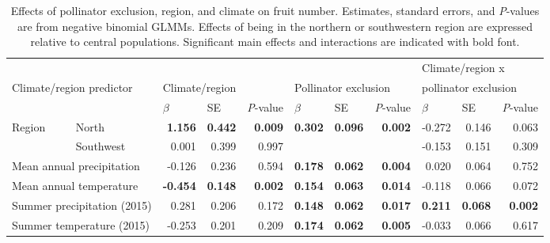 \documentclass{article}
\begin{document}
\clearpage


\begin{table}[p]
\centering
\caption[Effects of pollinator exclusion, region, and climate on fruit number.]{Effects of pollinator exclusion, region, and climate on fruit number. Estimates, standard errors, and \textit{P}-values are from negative binomial GLMMs. Effects of being in the northern or southwestern region are expressed relative to central populations. Significant main effects and interactions are indicated with bold font.}
\label{fruitstable}
\small
\begin{tabular}{llrrrrrrrrr}
\toprule
                            &                     &  & &                        &  &  &   & \multicolumn{3}{l}{Climate/region x}           \\
\multicolumn{2}{l}{Climate/region predictor}                    & \multicolumn{3}{l}{Climate/region} &    \multicolumn{3}{l}{Pollinator exclusion}                               & \multicolumn{3}{l}{pollinator exclusion} \\
                            &                     & \multicolumn{1}{l}{$\beta$} & \multicolumn{1}{l}{SE} & \multicolumn{1}{l}{\textit{P}-value} &  \multicolumn{1}{l}{$\beta$}  & \multicolumn{1}{l}{SE} &  \multicolumn{1}{l}{\textit{P}-value} &  \multicolumn{1}{l}{$\beta$}  & \multicolumn{1}{l}{SE} &  \multicolumn{1}{l}{\textit{P}-value} \\
\midrule
Region     & North               & \textbf{1.156}   & \textbf{0.442}  & \textbf{0.009} & \textbf{0.302} & \textbf{0.096} & \textbf{0.002} & -0.272 & 0.146 & 0.063 \\
                            & Southwest           & 0.001   & 0.399  & 0.997 &        &       &       & -0.153 & 0.151  & 0.309  \\
\midrule
\multicolumn{2}{l}{Mean annual precipitation}     & -0.126  & 0.236  & 0.594 & \textbf{0.178}  & \textbf{0.062} & \textbf{0.004} & 0.020  & 0.064  & 0.752  \\
\multicolumn{2}{l}{Mean annual temperature}       & \textbf{-0.454}  & \textbf{0.148}  & \textbf{0.002} & \textbf{0.154}  & \textbf{0.063} & \textbf{0.014} & -0.118 & 0.066  & 0.072  \\
\multicolumn{2}{l}{Summer precipitation (2015)}   & 0.281   & 0.206  & 0.172 & \textbf{0.148}  & \textbf{0.062} & \textbf{0.017} & \textbf{0.211}  & \textbf{0.068}  & \textbf{0.002}  \\
\multicolumn{2}{l}{Summer temperature (2015)}     & -0.253  & 0.201  & 0.209 & \textbf{0.174}  & \textbf{0.062} & \textbf{0.005} & -0.033 & 0.066  & 0.617  \\
\bottomrule
\end{tabular}
\end{table}
\end{document}
